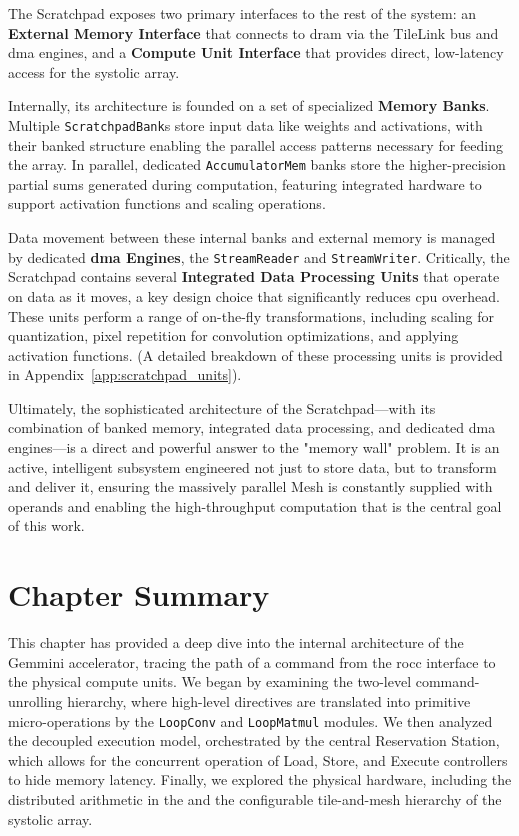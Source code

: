 The Scratchpad exposes two primary interfaces to the rest of the system: an \textbf{External Memory Interface} that connects to \acrshort{dram} via the TileLink bus and \acrshort{dma} engines, and a \textbf{Compute Unit Interface} that provides direct, low-latency access for the systolic array.

Internally, its architecture is founded on a set of specialized \textbf{Memory Banks}. Multiple \texttt{ScratchpadBank}s store input data like weights and activations, with their banked structure enabling the parallel access patterns necessary for feeding the array. In parallel, dedicated \texttt{AccumulatorMem} banks store the higher-precision partial sums generated during computation, featuring integrated hardware to support activation functions and scaling operations.

Data movement between these internal banks and external memory is managed by dedicated \textbf{\acrshort{dma} Engines}, the \texttt{StreamReader} and \texttt{StreamWriter}. Critically, the Scratchpad contains several \textbf{Integrated Data Processing Units} that operate on data as it moves, a key design choice that significantly reduces \acrshort{cpu} overhead. These units perform a range of on-the-fly transformations, including scaling for quantization, pixel repetition for convolution optimizations, and applying activation functions. (A detailed breakdown of these processing units is provided in Appendix~\ref{app:scratchpad_units}).

Ultimately, the sophisticated architecture of the Scratchpad—with its combination of banked memory, integrated data processing, and dedicated \acrshort{dma} engines—is a direct and powerful answer to the "memory wall" problem. It is an active, intelligent subsystem engineered not just to store data, but to transform and deliver it, ensuring the massively parallel Mesh is constantly supplied with operands and enabling the high-throughput computation that is the central goal of this work.

\section{Chapter Summary}

This chapter has provided a deep dive into the internal architecture of the Gemmini accelerator, tracing the path of a command from the \acrshort{rocc} interface to the physical compute units. We began by examining the two-level command-unrolling hierarchy, where high-level directives are translated into primitive micro-operations by the \texttt{LoopConv} and \texttt{LoopMatmul} modules. We then analyzed the decoupled execution model, orchestrated by the central Reservation Station, which allows for the concurrent operation of Load, Store, and Execute controllers to hide memory latency. Finally, we explored the physical hardware, including the distributed arithmetic in the  and the configurable tile-and-mesh hierarchy of the systolic array. 

